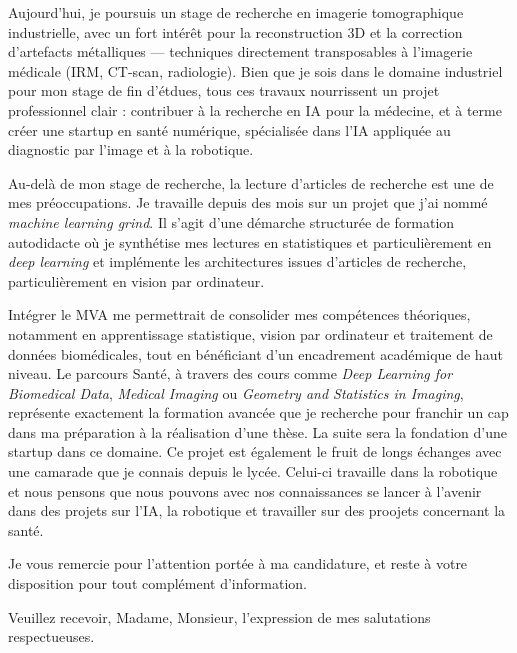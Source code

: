 Aujourd’hui, je poursuis un stage de recherche en imagerie tomographique industrielle, avec un fort intérêt pour la reconstruction 3D et la correction d’artefacts métalliques — techniques directement transposables à l’imagerie médicale (IRM, CT-scan, radiologie). Bien que je sois dans le domaine industriel pour mon stage de fin d'étdues, tous ces travaux nourrissent un projet professionnel clair : contribuer à la recherche en IA pour la médecine, et à terme créer une startup en santé numérique, spécialisée dans l’IA appliquée au diagnostic par l’image et à la robotique.

Au-delà de mon stage de recherche, la lecture d'articles de recherche est une de mes préoccupations. Je travaille depuis des mois sur un projet que j'ai nommé \textit{machine learning grind}. Il s'agit d'une démarche structurée de formation autodidacte où je synthétise mes lectures en statistiques et particulièrement en \textit{deep learning} et implémente les architectures issues d'articles de recherche, particulièrement en vision par ordinateur.

Intégrer le MVA me permettrait de consolider mes compétences théoriques, notamment en apprentissage statistique, vision par ordinateur et traitement de données biomédicales, tout en bénéficiant d’un encadrement académique de haut niveau. Le parcours Santé, à travers des cours comme \textit{Deep Learning for Biomedical Data}, \textit{Medical Imaging} ou \textit{Geometry and Statistics in Imaging}, représente exactement la formation avancée que je recherche pour franchir un cap dans ma préparation à la réalisation d'une thèse. La suite sera la fondation d'une startup dans ce domaine. Ce projet est également le fruit de longs échanges avec une camarade que je connais depuis le lycée. Celui-ci travaille dans la robotique et nous pensons que nous pouvons avec nos connaissances se lancer à l'avenir dans des projets sur l'IA, la robotique et travailler sur des proojets concernant la santé.

Je vous remercie pour l’attention portée à ma candidature, et reste à votre disposition pour tout complément d’information.

\vspace{0.5cm}

\noindent
Veuillez recevoir, Madame, Monsieur, l’expression de mes salutations respectueuses.

\vspace{0.8cm}
